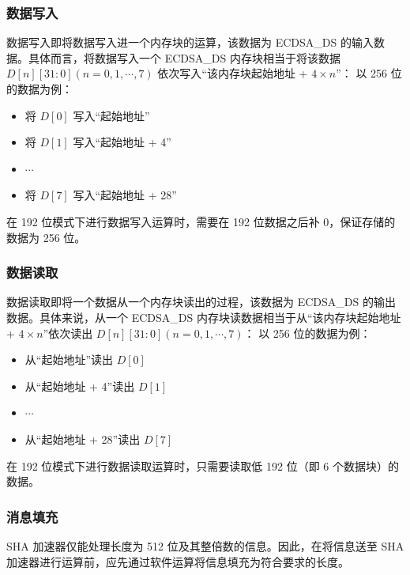 \documentclass[main\_\_CN.tex]{subfiles}
\begin{document}
\subsubsection{数据写入}

数据写入即将数据写入进一个内存块的运算，该数据为 ECDSA\_DS 的输入数据。具体而言，将数据写入一个 ECDSA\_DS 内存块相当于将该数据 $D[n][31:0] (n=0, 1, \cdots, 7)$ 依次写入“该内存块起始地址 + $4 \times n$”：
以 256 位的数据为例：
\begin{itemize}
    \item 将 $D[0]$ 写入“起始地址”
    \item 将 $D[1]$ 写入“起始地址 + 4”
    \item $\cdots$
    \item 将 $D[7]$ 写入“起始地址 + 28”
\end{itemize}

\begin{tiplisting}
在 192 位模式下进行数据写入运算时，需要在 192 位数据之后补 0，保证存储的数据为 256 位。
\end{tiplisting}

\clearpage
\subsubsection{数据读取}

数据读取即将一个数据从一个内存块读出的过程，该数据为 ECDSA\_DS 的输出数据。具体来说，从一个 ECDSA\_DS 内存块读数据相当于从“该内存块起始地址 + $4 \times n$”依次读出 $D[n][31:0] (n=0, 1, \cdots, 7)$：
以 256 位的数据为例：
\begin{itemize}
    \item 从“起始地址”读出 $D[0]$
    \item 从“起始地址 + 4”读出 $D[1]$
    \item $\cdots$
    \item 从“起始地址 + 28”读出 $D[7]$
\end{itemize}

\begin{tiplisting}
在 192 位模式下进行数据读取运算时，只需要读取低 192 位（即 6 个数据块）的数据。
\end{tiplisting}

\subsubsection{消息填充}\label{sec:ecdsa-msg-padding}

SHA 加速器仅能处理长度为 512 位及其整倍数的信息。因此，在将信息送至 SHA 加速器进行运算前，应先通过软件运算将信息填充为符合要求的长度。
\end{document}
